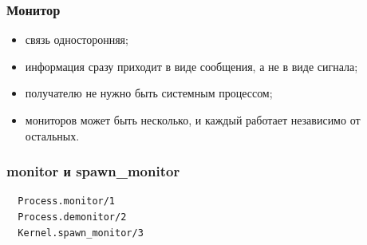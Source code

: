\documentclass[10pt]{beamer}
\begin{document}
\begin{frame}
  \frametitle{Монитор}
  \begin{itemize}
    \item связь односторонняя;
    \item информация сразу приходит в виде сообщения, а не в виде сигнала;
    \item получателю не нужно быть системным процессом;
    \item мониторов может быть несколько, и каждый работает независимо от остальных.
  \end{itemize}
\end{frame}

\begin{frame}[fragile]
  \frametitle{monitor и spawn\_monitor}
  \begin{lstlisting}
  Process.monitor/1
  Process.demonitor/2
  Kernel.spawn_monitor/3
  \end{lstlisting}
\end{frame}
\end{document}
